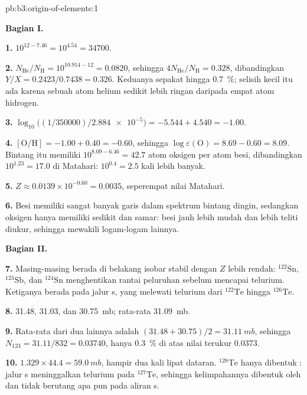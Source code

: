 \begin{solution}{pb:b3:origin-of-elements:1}

\textbf{Bagian I.}

\textbf{1.} $10^{12 - 7.46} = 10^{4.54} = \num{34700}$.

\textbf{2.} $N_\mathrm{He}/N_\mathrm{H} = 10^{10.914 - 12} = \num{0.0820}$, sehingga
$4N_\mathrm{He}/N_\mathrm{H} = \num{0.328}$, dibandingkan $Y/X =
0.2423/0.7438 = \num{0.326}$. Keduanya sepakat hingga \qty{0.7}{\percent}; selisih
kecil itu ada karena sebuah atom helium sedikit lebih ringan daripada
empat atom hidrogen.

\textbf{3.} $\log_{10}\bigl((1/350000)/\num{2.884e-5}\bigr) = -5.544 + 4.540 =
-1.00$.

\textbf{4.} $[\mathrm{O/H}] = -1.00 + 0.40 = -0.60$, sehingga
$\log\varepsilon(\mathrm{O}) = 8.69 - 0.60 = 8.09$. Bintang itu memiliki
$10^{8.09 - 6.46} = 42.7$ atom oksigen per atom besi, dibandingkan
$10^{1.23} = 17.0$ di Matahari: $10^{0.4} = 2.5$ kali lebih banyak.

\textbf{5.} $Z \approx 0.0139\times10^{-0.60} = \num{0.0035}$, seperempat
nilai Matahari.

\textbf{6.} Besi memiliki sangat banyak garis dalam spektrum bintang dingin, sedangkan
oksigen hanya memiliki sedikit dan samar: besi jauh lebih mudah
dan lebih teliti diukur, sehingga mewakili logam-logam lainnya.

\textbf{Bagian II.}

\textbf{7.} Masing-masing berada di belakang isobar stabil dengan $Z$ lebih rendah:
$^{122}\mathrm{Sn}$, $^{123}\mathrm{Sb}$, dan $^{124}\mathrm{Sn}$ menghentikan
rantai peluruhan  sebelum mencapai telurium. Ketiganya berada
pada jalur s, yang melewati telurium dari $^{122}\mathrm{Te}$ hingga
$^{126}\mathrm{Te}$.

\textbf{8.} \num{31.48}, \num{31.03}, dan \qty{30.75}{mb}; rata-rata
\qty{31.09}{mb}.

\textbf{9.} Rata-rata dari dua lainnya adalah $(31.48 + 30.75)/2 = \qty{31.11}{mb}$,
sehingga $N_{123} = 31.11/832 = \num{0.03740}$, hanya \qty{0.3}{\percent}
di atas nilai terukur \num{0.0373}.

\textbf{10.} $1.329\times44.4 = \qty{59.0}{mb}$, hampir dua kali lipat dataran.
$^{128}\mathrm{Te}$ hanya dibentuk : jalur s meninggalkan telurium pada
$^{127}\mathrm{Te}$, sehingga kelimpahannya dibentuk oleh  dan
tidak berutang apa pun pada aliran s.


\end{solution}
